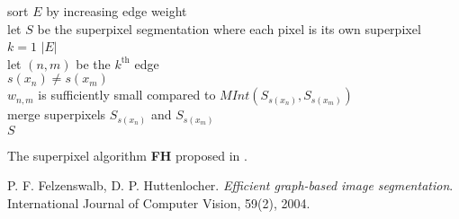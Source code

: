 \documentclass[12pt,a4paper]{article}
\begin{document}
	\begin{algorithm}[t]
		\begin{algo}{}{\label{algo:related-work-fh}}
			sort $E$ by increasing edge weight\\
			let $S$ be the superpixel segmentation where each pixel is its own superpixel\\
			\qfor $k = 1$ \qto $|E|$\\
				let $(n,m)$ be the $k^\text{th}$ edge\\
				\qif $s(x_n) \neq s(x_m)$\\
				\qthen \qif $w_{n,m}$ is sufficiently small compared to $MInt(S_{s(x_n)}, S_{s(x_m)})$\\
					\qthen merge superpixels $S_{s(x_n)}$ and $S_{s(x_m)}$\qfi\qfi\qrof\\
			\qreturn $S$
		\end{algo}
		\caption{The superpixel algorithm \textbf{FH} proposed in \cite{FelzenswalbHuttenlocher}.}
		\label{fig:related-work-fh-algorithm}
	\end{algorithm}

	\begin{thebibliography}{1}
		P. F. Felzenswalb,
		D. P. Huttenlocher.
		\emph{Efficient graph-based image segmentation}.
		International Journal of Computer Vision, 59(2), 2004.
	\end{thebibliography}
\end{document}
